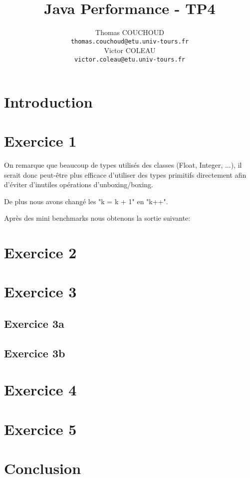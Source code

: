 \documentclass{report}
\title{Java Performance - TP4}
\author{Thomas COUCHOUD\\\texttt{thomas.couchoud@etu.univ-tours.fr}\\Victor COLEAU\\\texttt{victor.coleau@etu.univ-tours.fr}}
\begin{document}
	\mccTitle
	
	\chapter{Introduction}
	
	\chapter{Exercice 1}
		On remarque que beaucoup de types utilisés des classes (Float, Integer, ...), il serait donc peut-être plus efficace d'utiliser des types primitifs directement afin d'éviter d'inutiles opérations d'unboxing/boxing.
		
		De plus nous avons changé les "k = k + 1" en "k++".
		
		Après des mini benchmarks nous obtenons la sortie suivante:
		

		
	\chapter{Exercice 2}
	
	\chapter{Exercice 3}
		\section{Exercice 3a}
		
		\section{Exercice 3b}

	\chapter{Exercice 4}
	
	\chapter{Exercice 5}
	
	\chapter{Conclusion}
\end{document}
